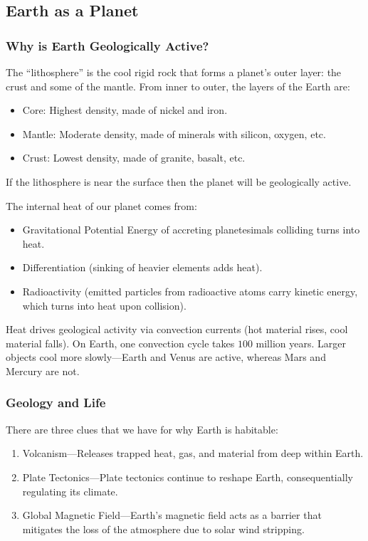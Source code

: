 \documentclass[class=article, crop=false]{standalone}
\begin{document}
  \subsection{Earth as a Planet}
  \subsubsection{Why is Earth Geologically Active?}
  The ``lithosphere'' is the cool rigid rock that forms a planet's outer layer: the crust and some of the mantle. From inner to outer, the layers of the Earth are:
  \begin{itemize}
    \item Core: Highest density, made of nickel and iron.
    \item Mantle: Moderate density, made of minerals with silicon, oxygen, etc.
    \item Crust: Lowest density, made of granite, basalt, etc.
  \end{itemize}
  \begin{note}{}
    If the lithosphere is near the surface then the planet will be geologically active.
  \end{note}
  The internal heat of our planet comes from:
  \begin{itemize}
    \item Gravitational Potential Energy of accreting planetesimals colliding turns into heat.
    \item Differentiation (sinking of heavier elements adds heat).
    \item Radioactivity (emitted particles from radioactive atoms carry kinetic energy, which turns into heat upon collision).
  \end{itemize}
  Heat drives geological activity via convection currents (hot material rises, cool material falls). On Earth, one convection cycle takes $100$ million years. Larger objects cool more slowly---Earth and Venus are active, whereas Mars and Mercury are not.
  \subsubsection{Geology and Life}
  There are three clues that we have for why Earth is habitable:
  \begin{enumerate}
    \item Volcanism---Releases trapped heat, gas, and material from deep within Earth.
    \item Plate Tectonics---Plate tectonics continue to reshape Earth, consequentially regulating its climate.
    \item Global Magnetic Field---Earth's magnetic field acts as a barrier that mitigates the loss of the atmosphere due to solar wind stripping.
  \end{enumerate}
\end{document}
